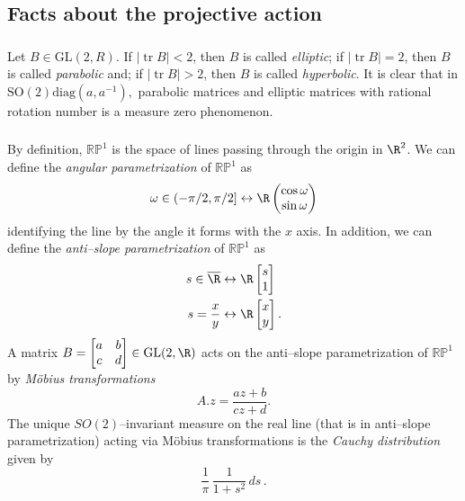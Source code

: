\documentclass[10pt]{amsart}
\numberwithin{equation}{section}     %
\newcommand{\C}{\mathbb{C}}
\renewcommand{\H}{\mathbb{H}}
\newcommand{\RP}{\mathbb{RP}}
\newcommand{\SL}{\mathrm{SL}}
\newcommand{\SO}{\mathrm{SO}}
\newcommand{\GL}{\mathrm{GL}}
\DeclareMathOperator{\trace}{tr}
\begin{document}
\subsection{Facts about the projective action}

\subsubsection{} Let $B  \in \GL(2,R)$. If $|\trace B| < 2$, then $B$ is called \textit{elliptic}; if $|\trace B| = 2$, then $B$ is called \textit{parabolic} and; if  $|\trace B| > 2$, then $B$ is called \emph{hyperbolic}. It is clear that in $\SO(2)\mathrm{diag}(a,a^{-1}),$ parabolic matrices and elliptic matrices with rational rotation number is a measure zero phenomenon. 

\subsubsection{}

By definition, $\RP^1$ is the space of lines passing through the origin in $\R^2$. We can define the \emph{angular parametrization} of $\RP^1$ as 
\begin{equation}
\omega \in (-\pi/2,\pi/2] \leftrightarrow \R \begin{pmatrix} \cos \omega \\ \sin \omega \end{pmatrix}
\end{equation}
identifying the line by the angle it forms with the $x$ axis.  In addition, we can define the \emph{anti--slope parametrization} of $\RP^1$ as 
\begin{align*}
    s \in \overline{\R} &\leftrightarrow \R \begin{bmatrix}
        s \\ 1
    \end{bmatrix} \\
    s = \frac{x}{y} &\leftrightarrow \R\begin{bmatrix}
        x \\ y
    \end{bmatrix}.
\end{align*}
A matrix $B = \begin{bmatrix}
    a & b \\
    c & d
\end{bmatrix}\in \GL(2,\R)$ acts on the anti--slope parametrization of $\RP^1$ by \emph{Möbius transformations} $$A.z = \frac{az + b}{cz + d}.$$ The unique $SO(2)$--invariant measure on the real line (that is in anti--slope parametrization) acting via Möbius transformations is the \emph{Cauchy distribution} given by \begin{equation} \label{cauchy_dist}
	\frac{1}{\pi} \, \frac{1}{1+s^2}  \, ds \, .
\end{equation}  
\end{document}
